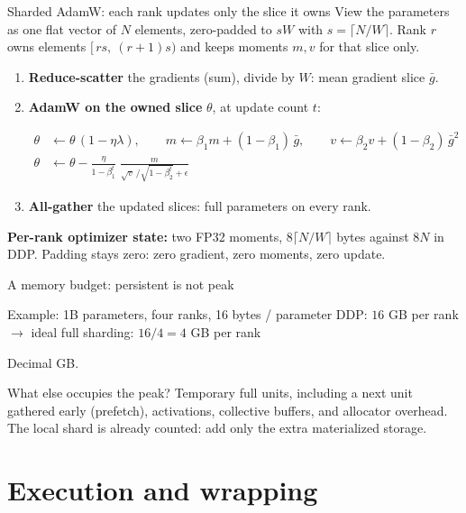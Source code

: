 \documentclass[handout]{beamer}
\begin{document}
\begin{frame}{Sharded AdamW: each rank updates only the slice it owns}
  \small
  View the parameters as one flat vector of $N$ elements, zero-padded to $sW$ with $s=\lceil N/W\rceil$. Rank $r$ owns elements $[\,rs,\ (r+1)s)$ and keeps moments $m,v$ for that slice only.
  \begin{enumerate}
    \item \textbf{Reduce-scatter} the gradients (sum), divide by $W$: mean gradient slice $\bar g$.
    \item \textbf{AdamW on the owned slice} $\theta$, at update count $t$:\par\vspace{-8pt}
      \begin{align*}
        \theta&\leftarrow\theta\,(1-\eta\lambda), \qquad
        m\leftarrow\beta_1 m+(1-\beta_1)\,\bar g, \qquad
        v\leftarrow\beta_2 v+(1-\beta_2)\,\bar g^{2}\\
        \theta&\leftarrow\theta-\frac{\eta}{1-\beta_1^{t}}\;
        \frac{m}{\sqrt{v}\,/\sqrt{1-\beta_2^{t}}+\epsilon}
      \end{align*}
    \item \textbf{All-gather} the updated slices: full parameters on every rank.
  \end{enumerate}
  \vfill
  \textbf{Per-rank optimizer state:} two FP32 moments, $8\lceil N/W\rceil$ bytes against $8N$ in DDP. Padding stays zero: zero gradient, zero moments, zero update.
\end{frame}

\begin{frame}{A memory budget: persistent is not peak}
  \begin{block}{Example: 1B parameters, four ranks, 16 bytes / parameter}
    DDP: $16$ GB per rank \quad $\longrightarrow$ \quad ideal full sharding: $16/4=4$ GB per rank
  \end{block}
  \small Decimal GB.
  \vfill
  \begin{alertblock}{What else occupies the peak?}
    Temporary full units, including a next unit gathered early (prefetch), activations, collective buffers, and allocator overhead. The local shard is already counted: add only the extra materialized storage.
  \end{alertblock}
\end{frame}

\section{Execution and wrapping}
\end{document}

